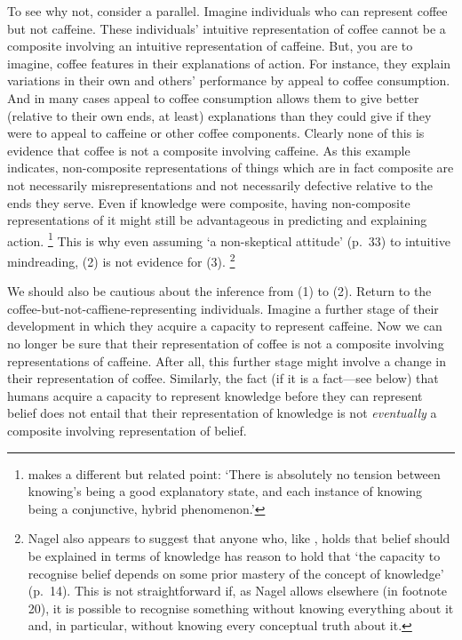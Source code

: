 \documentclass[11pt,a4paper]{extarticle}
\begin{document}
To see why not, consider a parallel.
Imagine individuals who can represent coffee but not caffeine.
These individuals' intuitive representation of coffee cannot be a composite involving an intuitive representation of caffeine.
But, you are to imagine, coffee features in their explanations of action.
For instance, they explain variations in their own and others' performance by appeal to coffee consumption.
And in many cases appeal to coffee consumption allows them to give better (relative to their own ends, at least) explanations than they could give if they were to appeal to caffeine or other coffee components.
Clearly none of this is evidence that coffee is not a composite involving caffeine.
As this example indicates, 
non-composite representations of things which are in fact composite are 
not necessarily misrepresentations 
and not necessarily defective relative to the ends they serve.
Even if knowledge were composite, having non-composite representations of it might still be advantageous in predicting and explaining action.%
\footnote{
\citet[p.\ 51]{fricker_2009} makes a different but related point: `There is absolutely no tension between knowing's being a good explanatory state, and each instance of knowing being a conjunctive, hybrid phenomenon.'
}
This is why even assuming `a non-skeptical attitude' (p.\ 33) to intuitive mindreading, (2) is not evidence for (3).%
\footnote{
Nagel also appears to suggest that anyone who, like \citet{Williamson:2000xz}, holds that belief should be explained in terms of knowledge 
has reason to hold that `the capacity to recognise belief depends on some prior mastery of the concept of knowledge' (p.\ 14).
This is not straightforward if, as Nagel allows elsewhere (in footnote 20), it is possible to recognise something without knowing everything about it and, in particular, without knowing every conceptual truth about it. 
}

We should also be cautious about the inference from (1) to (2).
Return to the coffee-but-not-caffiene-representing individuals.
Imagine a further stage of their development in which they acquire a capacity to represent caffeine.
Now we can no longer be sure that their representation of coffee is not a composite involving representations of caffeine.
After all, this further stage might involve a change in their representation of coffee.
Similarly, the fact (if it is a fact---see below) that humans acquire a capacity to represent knowledge before they can represent belief does not entail that their representation of knowledge is not \emph{eventually} a composite involving representation of belief.
\end{document}
